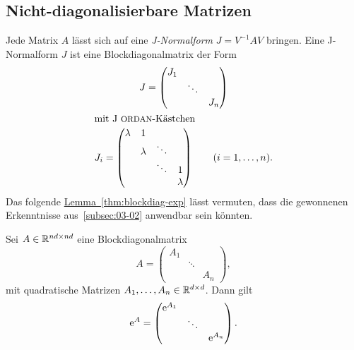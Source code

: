 \subsection{Nicht-diagonalisierbare Matrizen}\label{subsec:03-03}
Jede Matrix $A$ lässt sich auf eine \emph{J-Normalform} $J = V^{-1} A V$ bringen.
Eine J-Normalform $J$ ist eine Blockdiagonalmatrix der Form
\begin{gather*}
    J = \begin{pmatrix}
            J_1 &        &  \\
                & \ddots & \\
                &        & J_n
    \end{pmatrix}\\
    \intertext{mit J\textc{ordan}-Kästchen}
    J_i = \begin{pmatrix}
              \lambda & 1       &        & \\
                      & \lambda & \ddots & \\
                      &         & \ddots & 1 \\
                      &         &        & \lambda
    \end{pmatrix}
    \qquad (i = 1,\dots,n).
\end{gather*}
Das folgende \hyperref[thm:blockdiag-exp]{Lemma~\ref*{thm:blockdiag-exp}} lässt vermuten,
dass die gewonnenen Erkenntnisse aus~\autoref{subsec:03-02} anwendbar sein könnten.

\begin{lemma}\label{thm:blockdiag-exp}
    Sei $A \in \mathbb{R}^{nd \times nd}$ eine Blockdiagonalmatrix
    \begin{equation*}
        A = \begin{pmatrix}
                A_1 &        & \\
                    & \ddots & \\
                    &        & A_n
        \end{pmatrix},
    \end{equation*}
    mit quadratische Matrizen $A_1, \dots, A_n \in \mathbb{R}^{d \times d}$.
    Dann gilt
    \begin{equation*}
        \mathrm{e}^A = \begin{pmatrix}
                   \mathrm{e}^{A_1} &        & \\
                            & \ddots & \\
                            &        & \mathrm{e}^{A_n}
        \end{pmatrix}.
    \end{equation*}
\end{lemma}

